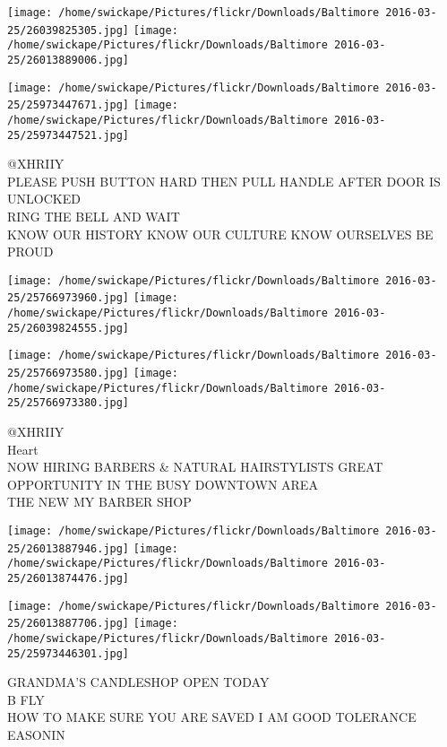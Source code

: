 \documentclass[10pt,letterpaper]{article}
\begin{document}
\texttt{[image: /home/swickape/Pictures/flickr/Downloads/Baltimore 2016-03-25/26039825305.jpg]}
\texttt{[image: /home/swickape/Pictures/flickr/Downloads/Baltimore 2016-03-25/26013889006.jpg]}

\texttt{[image: /home/swickape/Pictures/flickr/Downloads/Baltimore 2016-03-25/25973447671.jpg]}
\texttt{[image: /home/swickape/Pictures/flickr/Downloads/Baltimore 2016-03-25/25973447521.jpg]}

@XHRIIY\\
PLEASE PUSH BUTTON HARD THEN PULL HANDLE AFTER DOOR IS UNLOCKED\\
RING THE BELL AND WAIT\\
KNOW OUR HISTORY KNOW OUR CULTURE KNOW OURSELVES BE PROUD\\
\pagebreak

\texttt{[image: /home/swickape/Pictures/flickr/Downloads/Baltimore 2016-03-25/25766973960.jpg]}
\texttt{[image: /home/swickape/Pictures/flickr/Downloads/Baltimore 2016-03-25/26039824555.jpg]}

\texttt{[image: /home/swickape/Pictures/flickr/Downloads/Baltimore 2016-03-25/25766973580.jpg]}
\texttt{[image: /home/swickape/Pictures/flickr/Downloads/Baltimore 2016-03-25/25766973380.jpg]}

@XHRIIY\\
Heart\\
NOW HIRING BARBERS \& NATURAL HAIRSTYLISTS GREAT OPPORTUNITY IN THE BUSY DOWNTOWN AREA\\
THE NEW MY BARBER SHOP\\
\pagebreak

\texttt{[image: /home/swickape/Pictures/flickr/Downloads/Baltimore 2016-03-25/26013887946.jpg]}
\texttt{[image: /home/swickape/Pictures/flickr/Downloads/Baltimore 2016-03-25/26013874476.jpg]}

\texttt{[image: /home/swickape/Pictures/flickr/Downloads/Baltimore 2016-03-25/26013887706.jpg]}
\texttt{[image: /home/swickape/Pictures/flickr/Downloads/Baltimore 2016-03-25/25973446301.jpg]}

GRANDMA'S CANDLESHOP OPEN TODAY\\
B FLY\\
HOW TO MAKE SURE YOU ARE SAVED I AM GOOD TOLERANCE\\
EASONIN\\
\pagebreak
\end{document}
